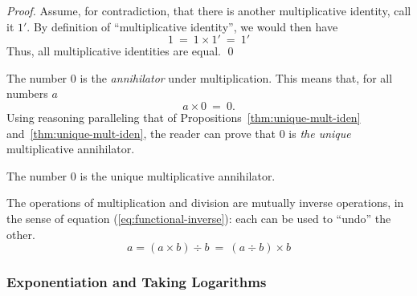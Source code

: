 \begin{proof}
Assume, for contradiction, that there is another multiplicative
identity, call it $1'$.  By definition of ``multiplicative identity'',
we would then have
\[ 1 \ = \ 1 \times 1' \ = \ 1' \]
Thus, all multiplicative identities are equal.  \qed
\end{proof}

\medskip

%
The number $0$ is the {\it annihilator} under
multiplication. This means that, for
all numbers $a$
\[ a \times 0 \ = \ 0. \]
Using reasoning paralleling that of
Propositions~\ref{thm:unique-mult-iden}
and~\ref{thm:unique-mult-iden}, the reader can prove that $0$ is {\em
  the unique} multiplicative annihilator.

\begin{prop}
The number $0$ is the unique multiplicative annihilator.
\end{prop}

\medskip

The operations of multiplication and division are mutually inverse
operations,
in the sense of equation (\ref{eq:functional-inverse}): each can be
used to ``undo'' the other.
\[ a = (a \times b) \div b \ = \ (a \div b) \times b  \]

\subsubsection{Exponentiation and Taking Logarithms}
\label{sec:exponentiation}

